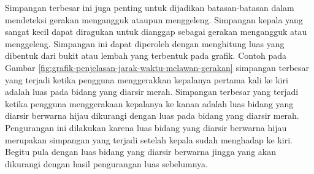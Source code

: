 Simpangan terbesar ini juga penting untuk dijadikan batasan-batasan dalam mendeteksi gerakan mengangguk ataupun menggeleng. Simpangan kepala yang sangat kecil dapat diragukan untuk dianggap sebagai gerakan mengangguk atau menggeleng. Simpangan ini dapat diperoleh dengan menghitung luas yang dibentuk dari bukit atau lembah yang terbentuk pada grafik. Contoh pada Gambar \ref{fig:grafik-penjelasan-jarak-waktu-melawan-gerakan} simpangan terbesar yang terjadi ketika pengguna menggerakkan kepalanya pertama kali ke kiri adalah luas pada bidang yang diarsir merah. Simpangan terbesar yang terjadi ketika pengguna menggerakaan kepalanya ke kanan adalah luas bidang yang diarsir berwarna hijau dikurangi dengan luas pada bidang yang diarsir merah. Pengurangan ini dilakukan karena luas bidang yang diarsir berwarna hijau merupakan simpangan yang terjadi setelah kepala sudah menghadap ke kiri. Begitu pula dengan luas bidang yang diarsir berwarna jingga yang akan dikurangi dengan hasil pengurangan luas sebelumnya.